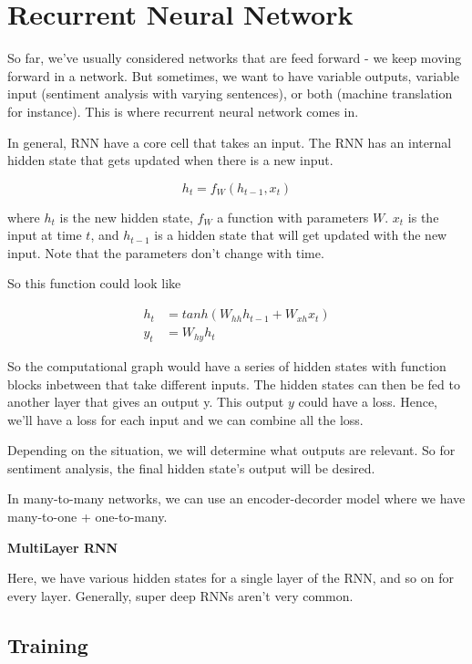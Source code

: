 \chapter{Recurrent Neural Network}

So far, we've usually considered networks that are feed forward - we keep moving forward in a network. But sometimes, we want to have variable outputs, variable input (sentiment analysis with varying sentences), or both (machine translation for instance). This is where recurrent neural network comes in. 

In general, RNN have a core cell that takes an input. The RNN has an internal hidden state that gets updated when there is a new input.

\begin{equation}
    h_t = f_W(h_{t-1}, x_t)
\end{equation}

where $h_t$ is the new hidden state, $f_W$ a function with parameters $W$. $x_t$ is the input at time $t$, and $h_{t-1}$ is a hidden state that will get updated with the new input. Note that the parameters don't change with time.

So this function could look like

\begin{align}
    h_t &= tanh(W_{hh}h_{t-1} + W_{xh}x_t) \\
    y_t &= W_{hy}h_t
\end{align}

So the computational graph would have a series of hidden states with function blocks inbetween that take different inputs. The hidden states can then be fed to another layer that gives an output y. This output $y$ could have a loss. Hence, we'll have a loss for each input and we can combine all the loss.

Depending on the situation, we will determine what outputs are relevant. So for sentiment analysis, the final hidden state's output will be desired. 

In many-to-many networks, we can use an encoder-decorder model where we have many-to-one + one-to-many. 

\textbf{MultiLayer RNN}

Here, we have various hidden states for a single layer of the RNN, and so on for every layer. Generally, super deep RNNs aren't very common. 

\section{Training}

